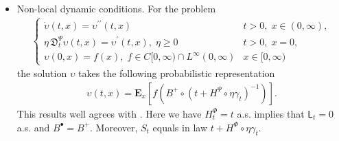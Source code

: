 \documentclass[11pt,a4paper]{article}
\theoremstyle{plain}
\theoremstyle{definition}
\theoremstyle{remark}
\begin{document}
\begin{itemize}
		\begin{align}
			\label{reflectedBM}
			\begin{cases}
				\displaystyle 	\dot{\upsilon}(t,x)= \upsilon^{\prime \prime}(t,x) & t>0,\; x \in (0,\infty),\\
				\displaystyle  \upsilon^\prime (t,x)=0    & t>0,\; x=0,\\
				\displaystyle 	\upsilon(0,x)=f(x), \; f \in C[0,\infty) \cap L^\infty(0, \infty)  &x\in [0, \infty).
			\end{cases}
		\end{align}
		
		
		
		
		It is well-known that almost surely, for $\alpha=0$ the subordinator dies immediately whereas for $\alpha=1$, it is the elementary subordinator $t$ (\cite[Section 3.1.1]{bertoin1999subordinators}). The process \eqref{process} for $\alpha \downarrow 0$ becomes a killed Brownian motion as expected for the solution of \eqref{killedBM}. For $\alpha \uparrow 1$, the subordinator becomes $H_t^\alpha = t$ and the process \eqref{process} is a reflected Brownian motion that does not jump at the boundary point. It reflects and never dies. Indeed, it coincides with a reflected Brownian motion on $[0,\infty)$ as expected for the solution of \eqref{reflectedBM}.
		
		
		\item[$\Phi=Id$)] Non-local dynamic conditions. For the problem
		\begin{align*}
			\begin{cases}
				\displaystyle 	\dot{\upsilon}(t,x)= \upsilon^{\prime \prime}(t,x) & t>0,\; x \in (0,\infty),\\
				\displaystyle 	\eta\, \mathfrak{D}_t^\Psi \upsilon(t,x) = \upsilon^\prime(t,x), \; \eta \geq 0   & t>0,\; x=0,\\
				\displaystyle 	\upsilon(0,x)=f(x), \; f \in C[0,\infty) \cap L^\infty(0, \infty)  &x\in [0, \infty)
			\end{cases}
		\end{align*}
		the solution $\upsilon$ takes the following probabilistic representation
		\begin{align}
			\upsilon(t,x)=\mathbf{E}_x\left[f(B^+ \circ (t+H^\Psi \circ \eta{\gamma_t})^{-1})\right].
			\label{Vbar}
		\end{align}
		This results well agrees with \cite[Theorem 3.1]{d2022fractionalsticky}. Here we have $H^\Phi_t=t$ a.s. implies that $\mathsf{L}_t = 0$ a.s. and $B^\bullet = B^+$. Moreover, $S_t$ equals in law $t + H^\Phi \circ \eta \gamma_t$. 
		

\end{itemize}
\end{document}
